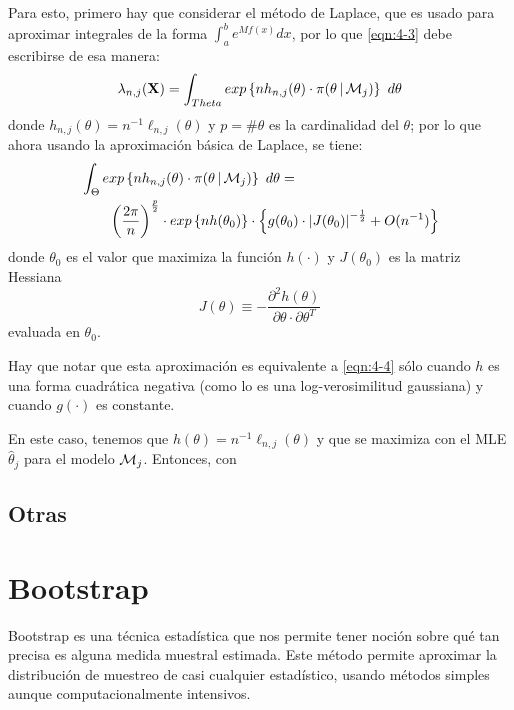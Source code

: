 Para esto, primero hay que considerar el método de Laplace, que es usado para aproximar integrales de la forma $\int_a^b e^{M f(x)} dx$, por lo que \eqref{eqn:4-3} debe escribirse de esa manera: 
\begin{equation}
\lambda_{n, j}(\textbf{X}) = \int_{Theta} exp\left\lbrace n h_{n, j}(\theta) \cdot \pi(\theta \,|\, \mathcal{M}_j) \right\rbrace ~d\theta 
\end{equation}
donde $h_{n, j}(\theta) = n^{-1} \ell_{n, j}(\theta)$ y $p = \#\theta$ es la cardinalidad del $\theta$; por lo que ahora usando la aproximación básica de Laplace, se tiene: 
\begin{equation}
\begin{split}
 &\int_{\Theta} exp \left\lbrace n h_{n, j}(\theta) \cdot \pi(\theta \,|\, \mathcal{M}_j) \right\rbrace ~d\theta = \\
 & \quad\quad \left( \frac{2 \pi}{n} \right)^{\frac{p}{2}} \cdot exp \left\lbrace n h(\theta_0) \right\rbrace \cdot
 \left\lbrace g(\theta_0) \cdot \left| J(\theta_0) \right| ^{-\frac{1}{2}} + O(n^{-1}) \right\rbrace
\end{split}
\end{equation}
donde $\theta_0$ es el valor que maximiza la función $h(\cdot)$ y $J(\theta_0)$ es la matriz Hessiana 
\begin{equation}
J(\theta) \equiv -\frac{\partial^2 h(\theta)}{\partial \theta \cdot \partial \theta^T}
\end{equation}
evaluada en $\theta_0$.

Hay que notar que esta aproximación es equivalente a \eqref{eqn:4-4} sólo cuando $h$ es una forma cuadrática negativa (como lo es una log-verosimilitud gaussiana) y cuando $g(\cdot)$ es constante. 

En este caso, tenemos que $h(\theta) = n^{-1} \ell_{n, j}(\theta)$ y que se maximiza con el \ac{MLE} $\hat \theta_j$ para el modelo $\mathcal{M}_j$. Entonces, con 

\subsection{Otras}

\section{Bootstrap}

Bootstrap es una técnica estadística que nos permite tener noción sobre qué tan precisa es alguna medida muestral estimada. Este método permite aproximar la distribución de muestreo de casi cualquier estadístico, usando métodos simples aunque computacionalmente intensivos. 


